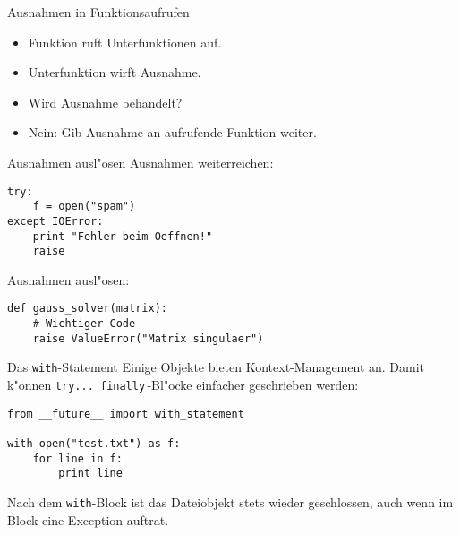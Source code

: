 \begin{frame}{Ausnahmen in Funktionsaufrufen}
\begin{figure}
{
}

{
}
\end{figure}
\begin{itemize}
\item<1-> Funktion ruft Unterfunktionen auf.
\item<4-> Unterfunktion wirft Ausnahme.
\item<5-> Wird Ausnahme behandelt?
\item<6-> Nein: Gib Ausnahme an aufrufende Funktion weiter.
\end{itemize}
\end{frame}

\begin{frame}[fragile]{Ausnahmen ausl"osen}
Ausnahmen weiterreichen:
\begin{lstlisting}[style=Python]
try:
    f = open("spam")
except IOError:
    print "Fehler beim Oeffnen!"
    raise
\end{lstlisting}
\vspace{3mm}
Ausnahmen ausl"osen:
\begin{lstlisting}[style=Python]
def gauss_solver(matrix):
    # Wichtiger Code
    raise ValueError("Matrix singulaer")
\end{lstlisting}
\end{frame}

\begin{frame}[fragile]{Das \texttt{with}-Statement}
Einige Objekte bieten Kontext-Management an. Damit k"onnen \lstinline{try... finally}\,-Bl"ocke einfacher geschrieben werden:
\begin{lstlisting}
from __future__ import with_statement

with open("test.txt") as f:
    for line in f:
        print line
\end{lstlisting}
Nach dem \lstinline{with}-Block ist das Dateiobjekt stets wieder geschlossen, auch wenn im Block eine Exception auftrat.
\end{frame}
